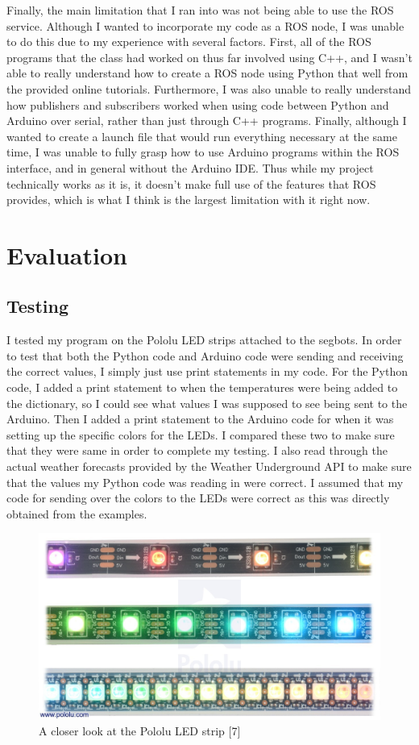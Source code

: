 \documentclass[12pt]{article}
\begin{document}
\indent Finally, the main limitation that I ran into was not being able to use the ROS service. Although I wanted to incorporate my code as a ROS node, I was unable to do this due to my experience with several factors. First, all of the ROS programs that the class had worked on thus far involved using C++, and I wasn't able to really understand how to create a ROS node using Python that well from the provided online tutorials. Furthermore, I was also unable to really understand how publishers and subscribers worked when using code between Python and Arduino over serial, rather than just through C++ programs. Finally, although I wanted to create a launch file that would run everything necessary at the same time, I was unable to fully grasp how to use Arduino programs within the ROS interface, and in general without the Arduino IDE. Thus while my project technically works as it is, it doesn't make full use of the features that ROS provides, which is what I think is the largest limitation with it right now. 


\section{Evaluation}

\subsection{Testing}
I tested my program on the Pololu LED strips attached to the segbots. In order to test that both the Python code and Arduino code were sending and receiving the correct values, I simply just use print statements in my code. For the Python code, I added a print statement to when the temperatures were being added to the dictionary, so I could see what values I was supposed to see being sent to the Arduino. Then I added a print statement to the Arduino code for when it was setting up the specific colors for the LEDs. I compared these two to make sure that they were same in order to complete my testing. I also read through the actual weather forecasts provided by the Weather Underground API to make sure that the values my Python code was reading in were correct. I assumed that my code for sending over the colors to the LEDs were correct as this was directly obtained from the examples.


\begin{figure}[ht]
\centering
\includegraphics[height=0.35\textwidth, width=\textwidth]{LED.jpg}
\caption{A closer look at the Pololu LED strip [7]}
\end{figure}
\end{document}

